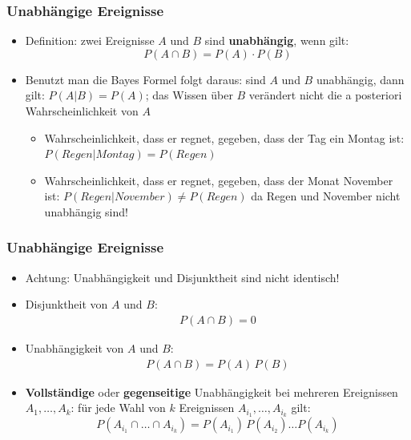 \begin{frame}
    \frametitle{Unabhängige Ereignisse}

    \begin{itemize}
        \item Definition: zwei Ereignisse $A$ und $B$ sind {\bf unabhängig}, wenn gilt:
        $$
        P(A \cap B) = P(A)\cdot P(B)
        $$  
        \item Benutzt man die Bayes Formel folgt daraus: sind $A$ und $B$ unabhängig, dann gilt: $P(A|B) = P(A)$; das Wissen über $B$ verändert nicht die a posteriori Wahrscheinlichkeit von $A$
        \begin{itemize}
            \item Wahrscheinlichkeit, dass er regnet, gegeben, dass der Tag ein Montag ist: $P(Regen|Montag) = P(Regen)$
            \item Wahrscheinlichkeit, dass er regnet, gegeben, dass der Monat November ist: $P(Regen|November) \neq P(Regen)$ da Regen und November nicht unabhängig sind!
        \end{itemize}
    \end{itemize}
    

\end{frame}

\begin{frame}
  \frametitle{Unabhängige Ereignisse}
  
  \begin{itemize}
  \item Achtung: Unabhängigkeit und Disjunktheit sind nicht identisch!
  \item Disjunktheit von $A$ und $B$:
    \begin{gather*}
      P(A \cap B) =0
    \end{gather*}
  \item Unabhängigkeit von $A$ und $B$:
    \begin{gather*}
      P(A \cap B) =P(A)\,P(B)
    \end{gather*}
  \item \textbf{Vollständige} oder \textbf{gegenseitige} Unabhängigkeit bei mehreren Ereignissen $A_1,\ldots,A_k$: für jede Wahl von $k$ Ereignissen $A_{i_1},\ldots,A_{i_k}$ gilt:
    $$
    P(A_{i_1} \cap \ldots \cap A_{i_k}) = P(A_{i_1})\,P(A_{i_2})\ldots P(A_{i_k})
    $$
  \end{itemize}    
\end{frame}

